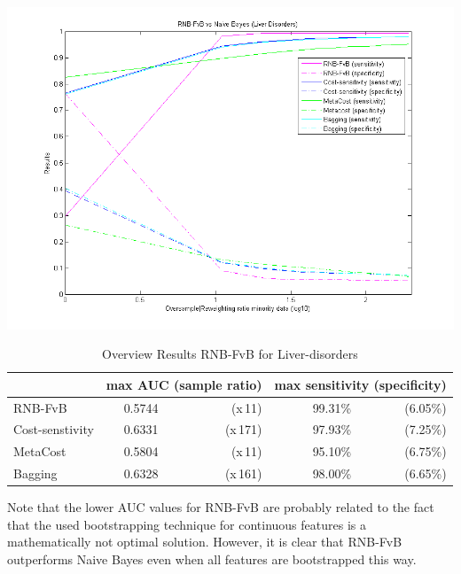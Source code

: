 \includegraphics[scale=0.65]{img/RNB-FvB-liverdisorder.png}

\begin{table}[h]
\centering  
\begin{tabular}{ l | c r | r r|}                                      
& \multicolumn{2}{c}{max AUC (sample ratio)} & \multicolumn{2}{c}{max sensitivity (specificity)} \\
\hline 
RNB-FvB & 0.5744 & (x\,11) & 99.31\% & (6.05\%)\\
Cost-senstivity & 0.6331 & (x\,171) & 97.93\% & (7.25\%)\\
MetaCost & 0.5804 & (x\,11) & 95.10\% & (6.75\%)\\
Bagging & 0.6328 & (x\,161) & 98.00\% & (6.65\%)\\
\hline                 
\end{tabular}
\label{tab:PPer}
\caption{Overview Results RNB-FvB for Liver-disorders} 
\end{table}
Note that the lower AUC values for RNB-FvB are probably related to the fact that the used bootstrapping technique for continuous features is a mathematically not optimal solution. However, it is clear that RNB-FvB outperforms Naive Bayes even when all features are bootstrapped this way.

